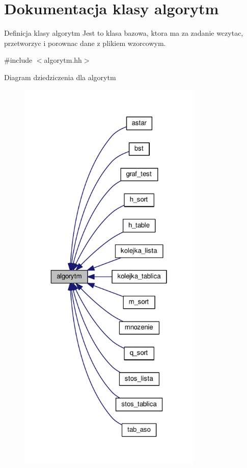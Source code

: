 \hypertarget{classalgorytm}{\section{Dokumentacja klasy algorytm}
\label{classalgorytm}
}


Definicja klasy algorytm Jest to klasa bazowa, ktora ma za zadanie wczytac, przetworzyc i porownac dane z plikiem wzorcowym.  




{\ttfamily \#include $<$algorytm.\-hh$>$}



Diagram dziedziczenia dla algorytm\nopagebreak
\begin{figure}[H]
\begin{center}
\leavevmode
\includegraphics[height=550pt]{classalgorytm__inherit__graph}
\end{center}
\end{figure}


